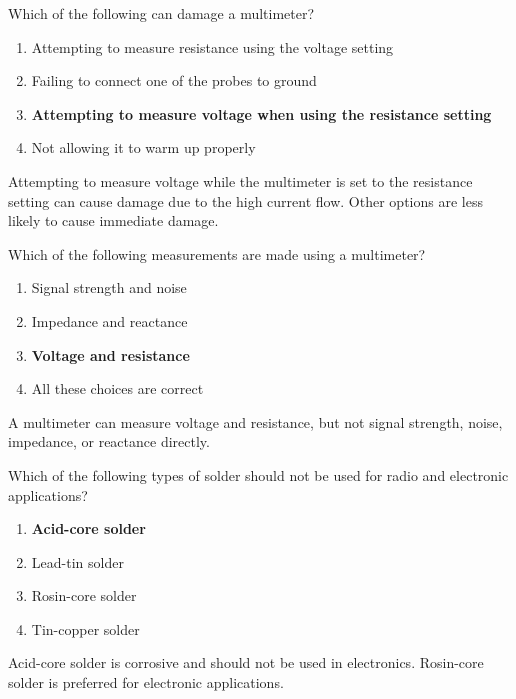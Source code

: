 \begin{tcolorbox}[colback=gray!10!white,colframe=black!75!black,title={T7D06}]
    Which of the following can damage a multimeter?
    \begin{enumerate}[label=\Alph*),noitemsep]
        \item Attempting to measure resistance using the voltage setting
        \item Failing to connect one of the probes to ground
        \item \textbf{Attempting to measure voltage when using the resistance setting}
        \item Not allowing it to warm up properly
    \end{enumerate}
\end{tcolorbox}
Attempting to measure voltage while the multimeter is set to the resistance setting can cause damage due to the high current flow. Other options are less likely to cause immediate damage.

\begin{tcolorbox}[colback=gray!10!white,colframe=black!75!black,title={T7D07}]
    Which of the following measurements are made using a multimeter?
    \begin{enumerate}[label=\Alph*),noitemsep]
        \item Signal strength and noise
        \item Impedance and reactance
        \item \textbf{Voltage and resistance}
        \item All these choices are correct
    \end{enumerate}
\end{tcolorbox}
A multimeter can measure voltage and resistance, but not signal strength, noise, impedance, or reactance directly.

\begin{tcolorbox}[colback=gray!10!white,colframe=black!75!black,title={T7D08}]
    Which of the following types of solder should not be used for radio and electronic applications?
    \begin{enumerate}[label=\Alph*),noitemsep]
        \item \textbf{Acid-core solder}
        \item Lead-tin solder
        \item Rosin-core solder
        \item Tin-copper solder
    \end{enumerate}
\end{tcolorbox}
Acid-core solder is corrosive and should not be used in electronics. Rosin-core solder is preferred for electronic applications.

